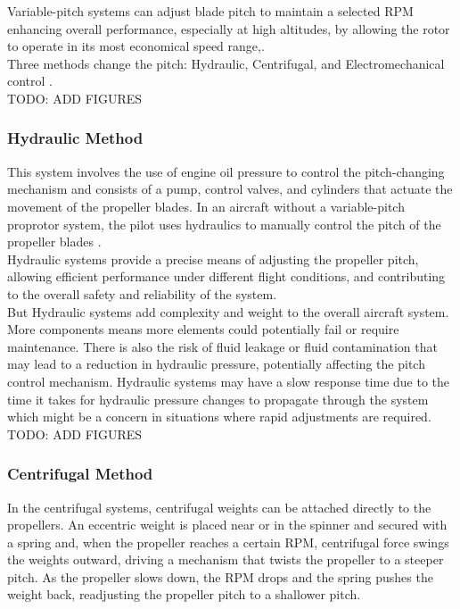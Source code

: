 Variable-pitch systems can adjust blade pitch to maintain a selected \gls{RPM} enhancing overall performance, especially at high altitudes, by allowing the rotor to operate in its most economical speed range\cite{VPP2},\cite{VPP3}.\\

Three methods change the pitch: Hydraulic, Centrifugal, and Electromechanical control \cite{VPP2}.\\
TODO: ADD FIGURES

\subsubsection{Hydraulic Method}
This system involves the use of engine oil pressure to control the pitch-changing mechanism and consists of a pump, control valves, and cylinders that actuate the movement of the propeller blades.
In an aircraft without a variable-pitch proprotor system, the pilot uses hydraulics to manually control the pitch of the propeller blades \cite{VPP2}.\\

Hydraulic systems provide a precise means of adjusting the propeller pitch, allowing efficient performance under different flight conditions, and contributing to the overall safety and reliability of the system.\\

But Hydraulic systems add complexity and weight to the overall aircraft system. 
More components means more elements could potentially fail or require maintenance. 
There is also the risk of fluid leakage or fluid contamination that may lead to a reduction in hydraulic pressure, potentially affecting the pitch control mechanism.
Hydraulic systems may have a slow response time due to the time it takes for hydraulic pressure changes to propagate through the system which might be a concern in situations where rapid adjustments are required.\cite{VPP2}
TODO: ADD FIGURES

\subsubsection{Centrifugal Method}
In the centrifugal systems, centrifugal weights can be attached directly to the propellers.
An eccentric weight is placed near or in the spinner and secured with a spring and, when the propeller reaches a certain \gls{RPM}, centrifugal force swings the weights outward, driving a mechanism that twists the propeller to a steeper pitch. 
As the propeller slows down, the \gls{RPM} drops and the spring pushes the weight back, readjusting the propeller pitch to a shallower pitch.

